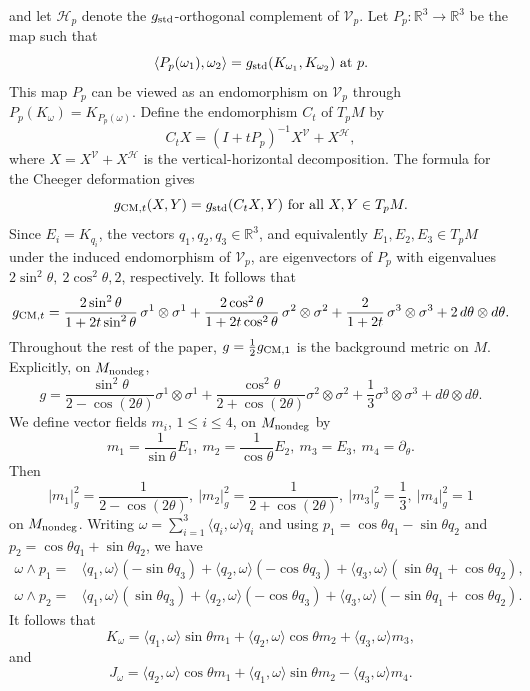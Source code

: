 \documentclass[11pt]{amsart}
\theoremstyle{definition}
\begin{document}
 and let $\mathcal{H}_p$ denote the $g_{\text{\rm std}}$-orthogonal complement of $\mathcal{V}_p$.
Let $P_p:\mathbb{R}^3\to \mathbb{R}^3$ be the map such that
\[\langle P_p(\omega_1), \omega_2\rangle= g_{\text{\rm std}}(K_{\omega_1},K_{\omega_2})\ \text{\rm at}\ p.\]
This map $P_p$ can be viewed as an endomorphism on $\mathcal{V}_p$ through $P_p(K_\omega)=K_{P_p(\omega)}$.
Define the endomorphism $C_t$ of $T_p M$ by 
\[C_tX= (I+tP_p)^{-1}X^{\mathcal{V}}+X^{\mathcal{H}},\]
where $X=X^{\mathcal{V}}+X^{\mathcal{H}}$ is the vertical-horizontal decomposition.
The formula for the Cheeger deformation \cite{Ziller} gives
\[g_{\text{\rm CM},t}(X,Y)= g_{\text{\rm std}}(C_t X, Y)\ \text{\rm for all}\ X,Y\in T_p M.\]
Since $E_i=K_{q_i}$, the vectors $q_1,q_2,q_3\in\mathbb{R}^3$, and equivalently $E_1,E_2,E_3\in T_p M$ under the induced endomorphism of $\mathcal{V}_p$, are eigenvectors of $P_p$ with eigenvalues $2\sin^2\theta,\ 2\cos^2\theta, 2$, respectively.
It follows that
\[g_{\text{\rm CM},t}=\frac{2\sin^2\theta}{1+2t\sin^2\theta} \, \sigma^1\otimes \sigma^1+\frac{2\cos^2\theta}{1+2t\cos^2\theta} \, \sigma^2\otimes \sigma^2
+\frac{2}{1+2t} \, \sigma^3\otimes \sigma^3 + 2 \, d\theta\otimes d\theta.\]
Throughout the rest of the paper, $g=\frac{1}{2}g_{\text{\rm CM},1}$ is the background metric on $M$.
Explicitly, on $M_{\text{\rm nondeg}}$,
\[
g=\frac{\sin^2\theta}{2-\cos(2\theta)}\sigma^1\otimes \sigma^1
+\frac{\cos^2\theta}{2+\cos(2\theta)}\sigma^2\otimes \sigma^2
+\frac{1}{3}\sigma^3\otimes \sigma^3+d\theta\otimes d\theta.
\]
We define vector fields $m_i$, $1 \leq i \leq 4$, on $M_{\text{\rm nondeg}}$ by
\[
m_1=\frac{1}{\sin\theta} E_1,\ m_2=\frac{1}{\cos\theta} E_2,\ m_3=E_3,\ m_4=\partial_\theta.
\] 
Then 
\[|m_1|_g^2 = \frac{1}{2-\cos(2\theta)},\ |m_2|_g^2 = \frac{1}{2+\cos(2\theta)},\ |m_3|_g^2 = \frac{1}{3},\ |m_4|_g^2 = 1\]
on $M_{\text{\rm nondeg}}$. Writing $\omega=\sum_{i=1}^3 \langle q_i,\omega \rangle q_i$ and using $p_1=\cos\theta q_1-\sin\theta q_2$ and $p_2=\cos\theta q_1+\sin\theta q_2$, we have
\begin{align*}
\omega\wedge p_1=& \langle q_1,\omega \rangle (-\sin\theta q_3)+\langle q_2,\omega \rangle (-\cos\theta q_3)+\langle q_3,\omega \rangle (\sin\theta q_1+\cos\theta q_2),\\
\omega\wedge p_2=& \langle q_1,\omega \rangle (\sin\theta q_3)+\langle q_2,\omega \rangle(-\cos\theta q_3)+\langle q_3,\omega \rangle(-\sin\theta q_1+\cos\theta q_2).
\end{align*}
It follows that
\begin{equation}\label{K.omega.in.mi}
K_\omega=\langle q_1,\omega \rangle\sin\theta m_1+\langle q_2,\omega \rangle\cos\theta m_2+\langle q_3,\omega \rangle m_3,    
\end{equation}
and
\begin{equation}\label{J.omega.in.mi}
J_\omega= \langle q_2,\omega \rangle\cos\theta m_1+\langle q_1,\omega \rangle\sin\theta m_2-\langle q_3,\omega \rangle m_4. 
\end{equation}
\end{document}
